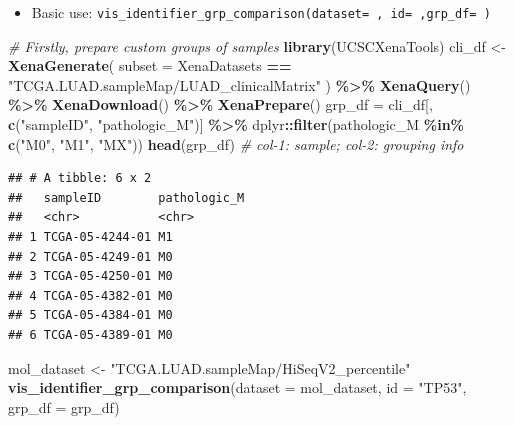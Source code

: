 \documentclass[
]{book}
\newenvironment{Shaded}{\begin{snugshade}}{\end{snugshade}}
\newcommand{\AttributeTok}[1]{\textcolor[rgb]{0.13,0.29,0.53}{#1}}
\newcommand{\CommentTok}[1]{\textcolor[rgb]{0.56,0.35,0.01}{\textit{#1}}}
\newcommand{\FunctionTok}[1]{\textcolor[rgb]{0.13,0.29,0.53}{\textbf{#1}}}
\newcommand{\NormalTok}[1]{#1}
\newcommand{\OtherTok}[1]{\textcolor[rgb]{0.56,0.35,0.01}{#1}}
\newcommand{\SpecialCharTok}[1]{\textcolor[rgb]{0.81,0.36,0.00}{\textbf{#1}}}
\newcommand{\StringTok}[1]{\textcolor[rgb]{0.31,0.60,0.02}{#1}}
\providecommand{\tightlist}{%
  \setlength{\itemsep}{0pt}\setlength{\parskip}{0pt}}
\begin{document}
\begin{itemize}
\tightlist
\item
  Basic use: \texttt{vis\_identifier\_grp\_comparison(dataset=\ ,\ id=\ ,grp\_df=\ )}
\end{itemize}

\begin{Shaded}
\begin{Highlighting}[]
\CommentTok{\# Firstly, prepare custom groups of samples}
\FunctionTok{library}\NormalTok{(UCSCXenaTools)}
\NormalTok{cli\_df }\OtherTok{\textless{}{-}} \FunctionTok{XenaGenerate}\NormalTok{(}
  \AttributeTok{subset =}\NormalTok{ XenaDatasets }\SpecialCharTok{==} \StringTok{"TCGA.LUAD.sampleMap/LUAD\_clinicalMatrix"}
\NormalTok{) }\SpecialCharTok{\%\textgreater{}\%}
  \FunctionTok{XenaQuery}\NormalTok{() }\SpecialCharTok{\%\textgreater{}\%}
  \FunctionTok{XenaDownload}\NormalTok{() }\SpecialCharTok{\%\textgreater{}\%}
  \FunctionTok{XenaPrepare}\NormalTok{()}
\NormalTok{grp\_df }\OtherTok{=}\NormalTok{ cli\_df[, }\FunctionTok{c}\NormalTok{(}\StringTok{"sampleID"}\NormalTok{, }\StringTok{"pathologic\_M"}\NormalTok{)] }\SpecialCharTok{\%\textgreater{}\%}
\NormalTok{  dplyr}\SpecialCharTok{::}\FunctionTok{filter}\NormalTok{(pathologic\_M }\SpecialCharTok{\%in\%} \FunctionTok{c}\NormalTok{(}\StringTok{"M0"}\NormalTok{, }\StringTok{"M1"}\NormalTok{, }\StringTok{"MX"}\NormalTok{))}
\FunctionTok{head}\NormalTok{(grp\_df) }\CommentTok{\# col{-}1: sample; col{-}2: grouping info}
\end{Highlighting}
\end{Shaded}

\begin{verbatim}
## # A tibble: 6 x 2
##   sampleID        pathologic_M
##   <chr>           <chr>       
## 1 TCGA-05-4244-01 M1          
## 2 TCGA-05-4249-01 M0          
## 3 TCGA-05-4250-01 M0          
## 4 TCGA-05-4382-01 M0          
## 5 TCGA-05-4384-01 M0          
## 6 TCGA-05-4389-01 M0
\end{verbatim}

\begin{Shaded}
\begin{Highlighting}[]
\NormalTok{mol\_dataset }\OtherTok{\textless{}{-}} \StringTok{"TCGA.LUAD.sampleMap/HiSeqV2\_percentile"}
\FunctionTok{vis\_identifier\_grp\_comparison}\NormalTok{(}\AttributeTok{dataset =}\NormalTok{ mol\_dataset, }\AttributeTok{id =} \StringTok{"TP53"}\NormalTok{, }
                              \AttributeTok{grp\_df =}\NormalTok{ grp\_df)}
\end{Highlighting}
\end{Shaded}
\end{document}
